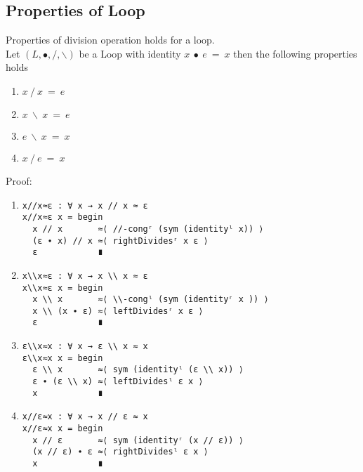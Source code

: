 \subsection{Properties of Loop}
Properties of division operation holds for a loop.\\
Let $(L, ∙, /, \backslash)$ be a Loop with identity $x\ ∙\ e\ =\ x$ then the following properties holds 
\begin{enumerate}
\item \(x \ /\  x\ =\ e\) 
\item \( x\ \backslash \ x\ =\ e\)
\item \(e\ \backslash \ x\ =\ x\) 
\item \(x\ /\ e\ =\ x\) 
\end{enumerate}
Proof:
\begin{enumerate}
\item 
\begin{verbatim}
x//x≈ε : ∀ x → x // x ≈ ε
x//x≈ε x = begin
  x // x       ≈⟨ //-congʳ (sym (identityˡ x)) ⟩
  (ε ∙ x) // x ≈⟨ rightDividesʳ x ε ⟩
  ε            ∎
\end{verbatim}
\item
\begin{verbatim}
x\\x≈ε : ∀ x → x \\ x ≈ ε
x\\x≈ε x = begin
  x \\ x       ≈⟨ \\-congˡ (sym (identityʳ x )) ⟩
  x \\ (x ∙ ε) ≈⟨ leftDividesʳ x ε ⟩
  ε            ∎
\end{verbatim}
\item
\begin{verbatim}
ε\\x≈x : ∀ x → ε \\ x ≈ x
ε\\x≈x x = begin
  ε \\ x       ≈⟨ sym (identityˡ (ε \\ x)) ⟩
  ε ∙ (ε \\ x) ≈⟨ leftDividesˡ ε x ⟩
  x            ∎
\end{verbatim}
\item
\begin{verbatim}
x//ε≈x : ∀ x → x // ε ≈ x
x//ε≈x x = begin
  x // ε       ≈⟨ sym (identityʳ (x // ε)) ⟩
  (x // ε) ∙ ε ≈⟨ rightDividesˡ ε x ⟩
  x            ∎
\end{verbatim}
\end{enumerate}

